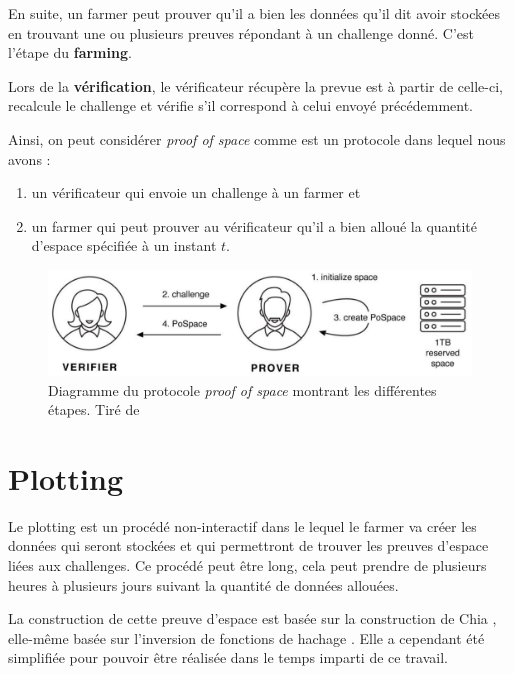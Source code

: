 \documentclass[../tb_report.tex]{subfiles}
\begin{document}
En suite, un farmer peut prouver qu'il a bien les données qu'il dit avoir stockées en trouvant une ou plusieurs preuves répondant à un challenge donné. C'est l'étape du \textbf{farming}.

Lors de la \textbf{vérification}, le vérificateur récupère la prevue est à partir de celle-ci, recalcule le challenge et vérifie s'il correspond à celui envoyé précédemment.

Ainsi, on peut considérer \emph{proof of space} comme est un protocole dans lequel nous avons :

\begin{enumerate}
  \item un vérificateur qui envoie un challenge à un farmer et
  \item un farmer qui peut prouver au vérificateur qu'il a bien alloué la quantité d'espace spécifiée à un instant $t$.
\end{enumerate}

\begin{figure}[H]
  \centering
  \includegraphics[width=\textwidth]{images/pospace.png}
  \caption{Diagramme du protocole \emph{proof of space} montrant les différentes étapes. Tiré de \cite{chia:consensus}}
\end{figure}

\section{Plotting}

Le plotting est un procédé non-interactif dans le lequel le farmer va créer les données qui seront stockées et qui permettront de trouver les preuves d'espace liées aux challenges. Ce procédé peut être long, cela peut prendre de plusieurs heures à plusieurs jours suivant la quantité de données allouées.

La construction de cette preuve d'espace est basée sur la construction de Chia \cite{chia:construction}, elle-même basée sur l'inversion de fonctions de hachage \cite{DBLP:conf/asiacrypt/AbusalahACKPR17}. Elle a cependant été simplifiée pour pouvoir être réalisée dans le temps imparti de ce travail. 
\end{document}

